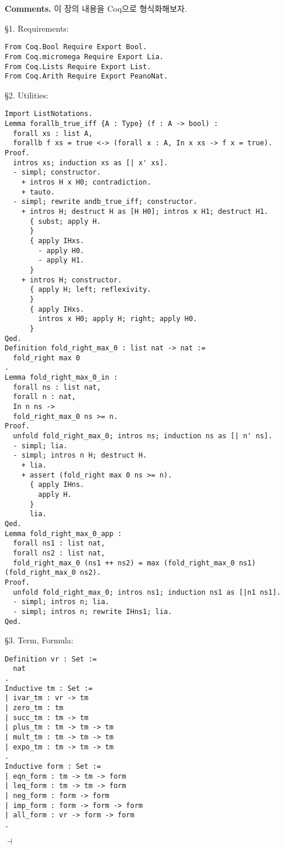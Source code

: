 \documentclass[12pt]{paper}
\newenvironment{context}[1][]{\noindent \textbf{{#1}.}}{\hfill $ \dashv $}
\begin{document}
  \begin{context}[Comments]
    이 장의 내용을 Coq으로 형식화해보자.

    \S1. Requirements:
\begin{lstlisting}[frame=single]
From Coq.Bool Require Export Bool.
From Coq.micromega Require Export Lia.
From Coq.Lists Require Export List.
From Coq.Arith Require Export PeanoNat.
\end{lstlisting}

    \S2. Utilities:
\begin{lstlisting}[frame=single]
Import ListNotations.
Lemma forallb_true_iff {A : Type} (f : A -> bool) :
  forall xs : list A,
  forallb f xs = true <-> (forall x : A, In x xs -> f x = true).
Proof.
  intros xs; induction xs as [| x' xs].
  - simpl; constructor.
    + intros H x H0; contradiction.
    + tauto.
  - simpl; rewrite andb_true_iff; constructor.
    + intros H; destruct H as [H H0]; intros x H1; destruct H1.
      { subst; apply H.
      }
      { apply IHxs.
        - apply H0.
        - apply H1.
      }
    + intros H; constructor.
      { apply H; left; reflexivity.
      }
      { apply IHxs.
        intros x H0; apply H; right; apply H0.
      }
Qed.
Definition fold_right_max_0 : list nat -> nat :=
  fold_right max 0
.
Lemma fold_right_max_0_in :
  forall ns : list nat,
  forall n : nat,
  In n ns ->
  fold_right_max_0 ns >= n.
Proof.
  unfold fold_right_max_0; intros ns; induction ns as [| n' ns].
  - simpl; lia.
  - simpl; intros n H; destruct H.
    + lia.
    + assert (fold_right max 0 ns >= n).
      { apply IHns.
        apply H.
      }
      lia.
Qed.
Lemma fold_right_max_0_app :
  forall ns1 : list nat,
  forall ns2 : list nat,
  fold_right_max_0 (ns1 ++ ns2) = max (fold_right_max_0 ns1) (fold_right_max_0 ns2).
Proof.
  unfold fold_right_max_0; intros ns1; induction ns1 as [|n1 ns1].
  - simpl; intros n; lia.
  - simpl; intros n; rewrite IHns1; lia.
Qed.
\end{lstlisting}

    \S3. Term, Formula:
\begin{lstlisting}[frame=single]
Definition vr : Set :=
  nat
.
Inductive tm : Set :=
| ivar_tm : vr -> tm
| zero_tm : tm
| succ_tm : tm -> tm
| plus_tm : tm -> tm -> tm
| mult_tm : tm -> tm -> tm
| expo_tm : tm -> tm -> tm
.
Inductive form : Set :=
| eqn_form : tm -> tm -> form
| leq_form : tm -> tm -> form
| neg_form : form -> form
| imp_form : form -> form -> form
| all_form : vr -> form -> form
.
\end{lstlisting}


\end{context}
\end{document}
